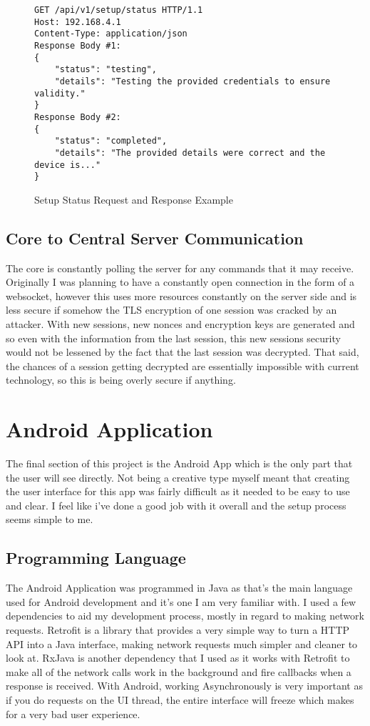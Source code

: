 \begin{figure}[H]
	\caption{Setup Status Request and Response Example}
	\begin{Verbatim}[frame=single]
GET /api/v1/setup/status HTTP/1.1
Host: 192.168.4.1
Content-Type: application/json
Response Body #1:
{
	"status": "testing",
	"details": "Testing the provided credentials to ensure validity."
}
Response Body #2:
{
	"status": "completed",
	"details": "The provided details were correct and the device is..."
}
	\end{Verbatim}
\end{figure}

\subsection{Core to Central Server Communication}
The core is constantly polling the server for any commands that it may receive. Originally I was planning to have a constantly open connection in the form of a websocket, however this uses more resources constantly on the server side and is less secure if somehow the TLS encryption of one session was cracked by an attacker. With new sessions, new nonces and encryption keys are generated and so even with the information from the last session, this new sessions security would not be lessened by the fact that the last session was decrypted. That said, the chances of a session getting decrypted are essentially impossible with current technology, so this is being overly secure if anything.

\section{Android Application}
The final section of this project is the Android App which is the only part that the user will see directly. Not being a creative type myself meant that creating the user interface for this app was fairly difficult as it needed to be easy to use and clear. I feel like i've done a good job with it overall and the setup process seems simple to me.

\subsection{Programming Language}
The Android Application was programmed in Java as that's the main language used for Android development and it's one I am very familiar with. I used a few dependencies to aid my development process, mostly in regard to making network requests. Retrofit is a library that provides a very simple way to turn a HTTP API into a Java interface, making network requests much simpler and cleaner to look at. RxJava is another dependency that I used as it works with Retrofit to make all of the network calls work in the background and fire callbacks when a response is received. With Android, working Asynchronously is very important as if you do requests on the UI thread, the entire interface will freeze which makes for a very bad user experience.

